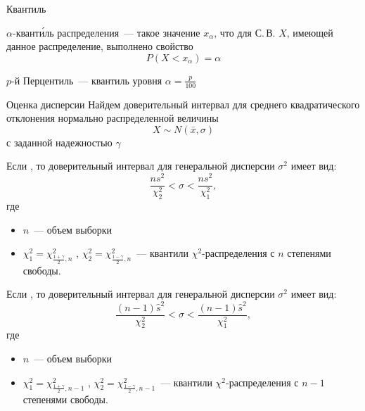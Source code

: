 \documentclass[unicode,11pt,notheorems,xcolor=table]{beamer}
\begin{document}
\begin{frame}[t]{Квантиль}{}
    \begin{block}{}
        \alert{$\alpha$-квант\'{и}ль} распределения~--- такое значение $x_\alpha$, что для С.\,В. $X$, имеющей данное распределение,  выполнено свойство  
        $$
            P(X< x_\alpha) = \alpha
        $$
    \end{block}
    
    \vfill
    \alert{$p$-й Перцентиль}~---  квантиль уровня $\alpha= \frac{p}{100}$
\end{frame}
\begin{frame}[allowframebreaks]{Оценка дисперсии}
Найдем доверительный интервал для среднего квадратического отклонения нормально распределенной величины
$$
    X\sim N(\bar{x},\sigma)
$$
с заданной надежностью $\gamma$



Если  , то доверительный интервал для генеральной дисперсии $\sigma^2$
имеет вид:  
$$
    \frac{ns^2}{\chi _2^2} < \sigma < \frac{ns^2}{\chi _1^2},
$$ 
где 
\begin{itemize}
    \item $n$~--- объем выборки
    \item $\chi _1^2=\chi_{\frac{1+\gamma } 2,n}^2$ , $\chi _2^2=\chi_{\frac{1-\gamma } 2,n}^2$~--- квантили  $\chi^2$\nobreakdash-распределения с $n$ степенями свободы.
\end{itemize}

\framebreak

 Если , то доверительный интервал для генеральной дисперсии $\sigma^2$ имеет вид: 
    $$
      \frac{(n-1)\hat{s}^2}{\chi_2^2} < \sigma < \frac{(n-1)\hat{s}^2}{\chi_1^2},
    $$
    где 
\begin{itemize}
    \item $n$~--- объем выборки
    \item $\chi _1^2=\chi_{\frac{1+\gamma } 2,n-1}^2$ , $\chi _2^2=\chi_{\frac{1-\gamma } 2,n-1}^2$~--- квантили  $\chi ^2$\nobreakdash-распределения с $n-1$ степенями свободы.
\end{itemize}
\end{frame}
\end{document}
